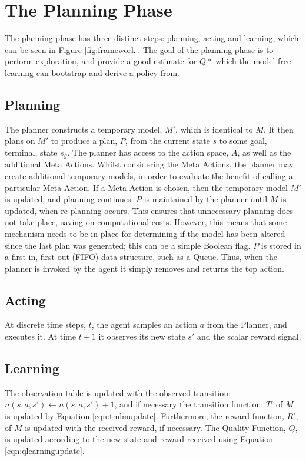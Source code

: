 \section{The Planning Phase}
The planning phase has three distinct steps: planning, acting and learning, which can be seen in Figure \ref{fig:framework}. The goal of the planning phase is to perform exploration, and provide a good estimate for $Q*$ which the model-free learning can bootstrap and derive a policy from.
\subsection{Planning}
The planner constructs a temporary model, $M'$, which is identical to $M$. It then plans on $M'$ to produce a plan, $P$, from the current state $s$ to some goal, terminal, state $s_g$. The planner has access to the action space, $A$, as well as the additional Meta Actions. Whilst considering the Meta Actions, the planner may create additional temporary models, in order to evaluate the benefit of calling a particular Meta Action. If a Meta Action is chosen, then the temporary model $M'$ is updated, and planning continues. $P$ is maintained by the planner until $M$ is updated, when re-planning occurs. This ensures that unnecessary planning does not take place, saving on computational costs. However, this means that some mechanism needs to be in place for determining if the model has been altered since the last plan was generated; this can be a simple Boolean flag. $P$ is stored in a first-in, first-out (FIFO) data structure, such as a Queue. Thus, when the planner is invoked by the agent it simply removes and returns the top action.
\subsection{Acting}
At discrete time steps, $t$, the agent samples an action $a$ from the Planner, and executes it. At time $t+1$ it observes its new state $s'$ and the scalar reward signal.
\subsection{Learning}
The observation table is updated with the observed transition: $n(s, a, s') \leftarrow n(s, a, s')+1$, and if necessary the transition function, $T'$ of $M$ is updated by Equation \ref{eqn:tmlmupdate}. Furthermore, the reward function, $R'$, of $M$ is updated with the received reward, if necessary. The Quality Function, $Q$, is updated according to the new state and reward received using Equation \ref{eqn:qlearningupdate}.
